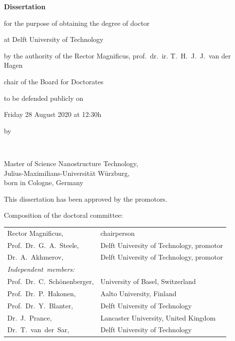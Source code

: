 \begin{titlepage}
\begin{center}
{\Large\titlefont\bfseries Dissertation}

\bigskip
\bigskip

for the purpose of obtaining the degree of doctor

at Delft University of Technology

by the authority of the Rector Magnificus, prof.~dr.~ir. T.~H.~J.~J.~van der Hagen

chair of the Board for Doctorates

to be defended publicly on

Friday 28 August 2020 at 12:30h

\bigskip
\bigskip

by

\bigskip
\bigskip

\makeatletter
{\Large\titlefont\bfseries\@firstname\ {\titleshape\@lastname}}
\makeatother

\bigskip
\bigskip

Master of Science Nanostructure Technology, \\
Julius-Maximilians-Universität Würzburg, \\
born in Cologne, Germany

\vspace*{2\bigskipamount}

\end{center}

\clearpage
\thispagestyle{empty}

\noindent This dissertation has been approved by the promotors.

\bigskip
\noindent Composition of the doctoral committee:

\medskip\noindent
\begin{tabular}{p{3.5cm}l}
    Rector Magnificus, & chairperson \\
%    
    Prof.~Dr.~G.~A.~Steele, & Delft University of Technology, promotor \\
%    
    Dr.~A.~Akhmerov, & Delft University of Technology, promotor \\

    \medskip
    \mbox{\emph{Independent members:}} & \\
    
    Prof.~Dr.~C.~Schönenberger, & University of Basel, Switzerland \\
%    
    Prof.~Dr.~P.~Hakonen, & Aalto University, Finland \\
%    
    Prof.~Dr.~Y.~Blanter, & Delft University of Technology \\
%    
    Dr.~J.~Prance, & Lancaster University, United Kingdom \\
%
    Dr.~T.~van~der~Sar, & Delft University of Technology \\
    

\end{tabular}
\end{titlepage}
